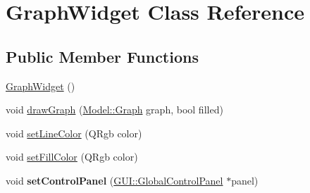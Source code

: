 \hypertarget{classGUI_1_1GraphWidget}{}\section{Graph\+Widget Class Reference}
\label{classGUI_1_1GraphWidget}
\subsection*{Public Member Functions}
\begin{DoxyCompactItemize}
\item 
\hyperlink{classGUI_1_1GraphWidget_a6d80d51caf0aee4c148baee49978f8c3}{Graph\+Widget} ()
\item 
void \hyperlink{classGUI_1_1GraphWidget_a25c17e8ca0168048e36c347f423ed017}{draw\+Graph} (\hyperlink{classModel_1_1Graph}{Model\+::\+Graph} graph, bool filled)
\item 
void \hyperlink{classGUI_1_1GraphWidget_ac7a4a8dd961c4b9c732ef22bfb4143ce}{set\+Line\+Color} (Q\+Rgb color)
\item 
void \hyperlink{classGUI_1_1GraphWidget_a7d8af579d2c285a372ec5bc60cbac4c1}{set\+Fill\+Color} (Q\+Rgb color)
\item 
\hypertarget{classGUI_1_1GraphWidget_a7b9e0f55d4f00ec543cc714478104c80}{}void {\bfseries set\+Control\+Panel} (\hyperlink{classGUI_1_1GlobalControlPanel}{G\+U\+I\+::\+Global\+Control\+Panel} $\ast$panel)\label{classGUI_1_1GraphWidget_a7b9e0f55d4f00ec543cc714478104c80}

\end{DoxyCompactItemize}
